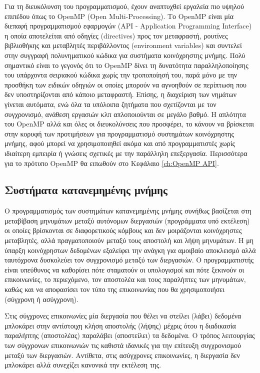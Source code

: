 Για τη διευκόλυνση του προγραμματισμού, έχουν αναπτυχθεί εργαλεία πιο υψηλού επιπέδου όπως το OpenMP (Open Multi-Processing). Το OpenMP είναι μία διεπαφή προγραμματισμού εφαρμογών (API - Application Programming Interface) η οποία αποτελείται από οδηγίες (directives) προς τον μεταφραστή, ρουτίνες βιβλιοθήκης και μεταβλητές περιβάλλοντος (environment variables) και συντελεί στην συγγραφή πολυνηματικού κώδικα για συστήματα κοινόχρηστης μνήμης. Πολύ σημαντικό είναι το γεγονός ότι το OpenMP δίνει τη δυνατότητα παραλληλοποίησης του υπάρχοντα σειριακού κώδικα χωρίς την τροποποίησή του, παρά μόνο με την προσθήκη των ειδικών οδηγιών οι οποίες μπορούν να αγνοηθούν σε περίπτωση που δεν υποστηρίζονται από κάποιο μεταφραστή. Επίσης, η διαχείριση των νημάτων γίνεται αυτόματα, ενώ όλα τα υπόλοιπα ζητήματα που σχετίζονται με τον συγχρονισμό, ανάθεση εργασιών κλπ απλοποιούνται σε μεγάλο βαθμό. Η απλότητα του OpenMP αλλά και όλες οι διευκολύνσεις που προσφέρει, το κάνουν να βρίσκεται στην κορυφή των προτιμήσεων για προγραμματισμό συστημάτων κοινόχρηστης μνήμης, αφού μπορεί να χρησιμοποιηθεί ακόμα και από προγραμματιστές χωρίς ιδιαίτερη εμπειρία ή γνώσεις σχετικές με την παράλληλη επεξεργασία. Περισσότερα για το πρότυπο OpenMP θα ειπωθούν στο Κεφάλαιο \ref{ch:OpenMP API}.


\subsection{Συστήματα κατανεμημένης μνήμης}
Ο προγραμματισμός των συστημάτων κατανεμημένης μνήμης συνήθως βασίζεται στη μεταβίβαση μηνυμάτων μεταξύ αυτόνομων διεργασιών (προγράμματα υπό εκτέλεση) οι οποίες βρίσκονται σε διαφορετικούς κόμβους και δεν μοιράζονται κοινόχρηστες μεταβλητές, αλλά πραγματοποιούν μεταξύ τους αποστολή και λήψη μηνυμάτων. Η μη ύπαρξη κοινόχρηστων δεδομένων εξαλείφει την ανάγκη για αμοιβαίο αποκλεισμό αλλά ταυτόχρονα δυσκολεύει τον συγχρονισμό μεταξύ των διεργασιών. Ο προγραμματιστής είναι υπεύθυνος να καθορίσει πότε σταματούν οι υπολογισμοί και πότε ξεκινούν οι επικοινωνίες, το περιεχόμενο, τον αποστολέα και τους παραλήπτες των μηνυμάτων, καθώς και να αποφασίσει τον τύπο της επικοινωνίας που θα χρησιμοποιήσει (σύγχρονη ή ασύγχρονη).

Στις σύγχρονες επικοινωνίες μία διεργασία που θέλει να στείλει (λάβει) δεδομένα μπλοκάρει στην αντίστοιχη κλήση αποστολής (λήψης) μέχρις ότου η διαδικασία παραλήπτης (αποστολέας) παραλάβει (αποστείλει) τα δεδομένα. Ο τρόπος λειτουργίας των σύγχρονων επικοινωνιών τις καθιστά ιδανικές για την επίτευξη συγχρονισμού μεταξύ των διεργασιών. Αντίθετα, στις ασύγχρονες επικοινωνίες, η διεργασία δεν μπλοκάρει αλλά συνεχίζει κανονικά την εκτέλεση της.

